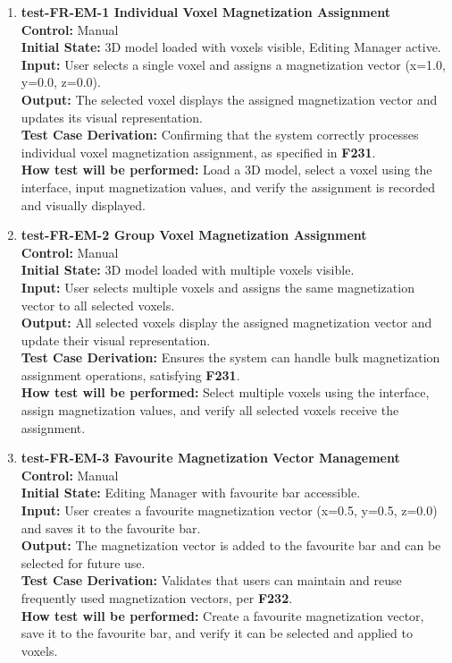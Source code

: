 \documentclass[12pt, titlepage]{article}
\begin{document}
\begin{enumerate}
  \item \textbf{test-FR-EM-1 Individual Voxel Magnetization Assignment} \\[2mm]
    \textbf{Control:} Manual \\ 
    \textbf{Initial State:} 3D model loaded with voxels visible, Editing Manager active. \\ 
    \textbf{Input:} User selects a single voxel and assigns a magnetization vector (x=1.0, y=0.0, z=0.0). \\ 
    \textbf{Output:} The selected voxel displays the assigned magnetization vector and updates its visual representation. \\[2mm]
    \textbf{Test Case Derivation:} Confirming that the system correctly processes individual voxel magnetization assignment, as specified in \textbf{F231}. \\[2mm]
    \textbf{How test will be performed:} Load a 3D model, select a voxel using the interface, input magnetization values, and verify the assignment is recorded and visually displayed.

  \item \textbf{test-FR-EM-2 Group Voxel Magnetization Assignment} \\[2mm]
    \textbf{Control:} Manual \\ 
    \textbf{Initial State:} 3D model loaded with multiple voxels visible. \\ 
    \textbf{Input:} User selects multiple voxels and assigns the same magnetization vector to all selected voxels. \\ 
    \textbf{Output:} All selected voxels display the assigned magnetization vector and update their visual representation. \\[2mm]
    \textbf{Test Case Derivation:} Ensures the system can handle bulk magnetization assignment operations, satisfying \textbf{F231}. \\[2mm]
    \textbf{How test will be performed:} Select multiple voxels using the interface, assign magnetization values, and verify all selected voxels receive the assignment.

  \item \textbf{test-FR-EM-3 Favourite Magnetization Vector Management} \\[2mm]
    \textbf{Control:} Manual \\ 
    \textbf{Initial State:} Editing Manager with favourite bar accessible. \\ 
    \textbf{Input:} User creates a favourite magnetization vector (x=0.5, y=0.5, z=0.0) and saves it to the favourite bar. \\ 
    \textbf{Output:} The magnetization vector is added to the favourite bar and can be selected for future use. \\[2mm]
    \textbf{Test Case Derivation:} Validates that users can maintain and reuse frequently used magnetization vectors, per \textbf{F232}. \\[2mm]
    \textbf{How test will be performed:} Create a favourite magnetization vector, save it to the favourite bar, and verify it can be selected and applied to voxels.


\end{enumerate}
\end{document}
